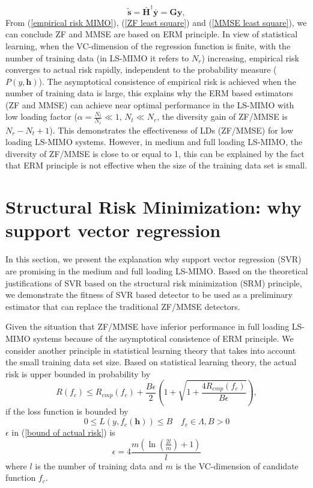 \documentclass[10pt, draftclsnofoot, onecolumn]{IEEEtran}
\begin{document}
\begin{equation}
\tilde{\mathbf{s}}=\bar{\mathbf{H}}^{\dagger}\bar{\mathbf{y}}=\mathbf{G}\mathbf{y},
\label{MMSE solution}
\end{equation} 
From (\ref{empirical risk MIMO}), (\ref{ZF least square}) and (\ref{MMSE least square}), we can conclude ZF and MMSE are based on ERM principle. In view of statistical learning, when the VC-dimension of the regression function is finite\cite{vapnik1998statistical}, with the number of training data (in LS-MIMO it refers to $N_{r}$) increasing, empirical risk converges to actual risk rapidly, independent to the probability measure ($P(y, \mathbf{h})$)\cite{vapnik1998statistical}. The asymptotical consistence of empirical risk is achieved when the number of training data is large, this explains why the ERM based estimators (ZF and MMSE) can achieve near optimal performance in the LS-MIMO with low loading factor ($\alpha=\frac{N_{t}}{N_{r}}\ll 1$, $N_{t}\ll N_{r}$, the diversity gain of ZF/MMSE is $N_{r}-N_{t}+1$\cite{paulraj2003introduction}). This demonstrates the effectiveness of LDs (ZF/MMSE) for low loading LS-MIMO systems. However, in medium and full loading LS-MIMO, the diversity of ZF/MMSE is close to or equal to 1, this can be explained by the fact that ERM principle is not effective when the size of the training data set is small.

\section{Structural Risk Minimization: why support vector regression}
In this section, we present the explanation why support vector regression (SVR) are promising in the medium and full loading LS-MIMO. Based on the theoretical justifications of SVR based on the structural risk minimization (SRM) principle, we demonstrate the fitness of SVR based detector to be used as a preliminary estimator that can replace the traditional ZF/MMSE detectors.

Given the situation that ZF/MMSE have inferior performance in full loading LS-MIMO systems because of the asymptotical consistence of ERM principle. We consider another principle in statistical learning theory that takes into account the small training data set size. Based on statistical learning theory, the actual risk is upper bounded in probability by\cite{vapnik1998statistical}
\begin{equation}
R(f_{c})\leq R_{emp}(f_{c})+\frac{B\epsilon}{2}(1+\sqrt{1+\frac{4R_{emp}(f_{c})}{B\epsilon}}),
\label{bound of actual risk}
\end{equation}
if the loss function is bounded by 
\begin{equation}
0\leq L(y, f_{c}(\mathbf{h}))\leq B\quad f_{c}\in \Lambda, B>0
\label{bound of loss function}
\end{equation}
$\epsilon$ in (\ref{bound of actual risk}) is 
\begin{equation}
\epsilon=4\frac{m(\ln(\frac{2l}{m})+1)}{l}
\label{epsilon bound}
\end{equation}
where $l$ is the number of training data and $m$ is the VC-dimension of candidate function $f_{c}$. 
\end{document}
